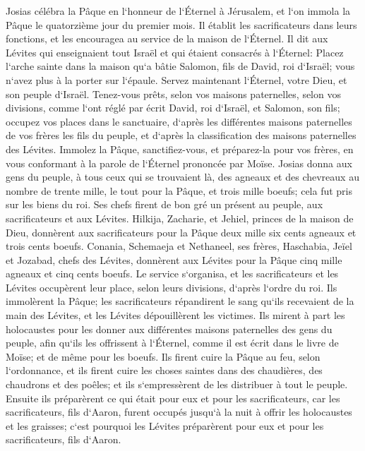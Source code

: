 \verse Josias célébra la Pâque en l`honneur de l`Éternel à Jérusalem, et l`on immola la Pâque le quatorzième jour du premier mois. 
\verse Il établit les sacrificateurs dans leurs fonctions, et les encouragea au service de la maison de l`Éternel. 
\verse Il dit aux Lévites qui enseignaient tout Israël et qui étaient consacrés à l`Éternel: Placez l`arche sainte dans la maison qu`a bâtie Salomon, fils de David, roi d`Israël; vous n`avez plus à la porter sur l`épaule. Servez maintenant l`Éternel, votre Dieu, et son peuple d`Israël. 
\verse Tenez-vous prêts, selon vos maisons paternelles, selon vos divisions, comme l`ont réglé par écrit David, roi d`Israël, et Salomon, son fils; 
\verse occupez vos places dans le sanctuaire, d`après les différentes maisons paternelles de vos frères les fils du peuple, et d`après la classification des maisons paternelles des Lévites. 
\verse Immolez la Pâque, sanctifiez-vous, et préparez-la pour vos frères, en vous conformant à la parole de l`Éternel prononcée par Moïse. 
\verse Josias donna aux gens du peuple, à tous ceux qui se trouvaient là, des agneaux et des chevreaux au nombre de trente mille, le tout pour la Pâque, et trois mille boeufs; cela fut pris sur les biens du roi. 
\verse Ses chefs firent de bon gré un présent au peuple, aux sacrificateurs et aux Lévites. Hilkija, Zacharie, et Jehiel, princes de la maison de Dieu, donnèrent aux sacrificateurs pour la Pâque deux mille six cents agneaux et trois cents boeufs. 
\verse Conania, Schemaeja et Nethaneel, ses frères, Haschabia, Jeïel et Jozabad, chefs des Lévites, donnèrent aux Lévites pour la Pâque cinq mille agneaux et cinq cents boeufs. 
\verse Le service s`organisa, et les sacrificateurs et les Lévites occupèrent leur place, selon leurs divisions, d`après l`ordre du roi. 
\verse Ils immolèrent la Pâque; les sacrificateurs répandirent le sang qu`ils recevaient de la main des Lévites, et les Lévites dépouillèrent les victimes. 
\verse Ils mirent à part les holocaustes pour les donner aux différentes maisons paternelles des gens du peuple, afin qu`ils les offrissent à l`Éternel, comme il est écrit dans le livre de Moïse; et de même pour les boeufs. 
\verse Ils firent cuire la Pâque au feu, selon l`ordonnance, et ils firent cuire les choses saintes dans des chaudières, des chaudrons et des poêles; et ils s`empressèrent de les distribuer à tout le peuple. 
\verse Ensuite ils préparèrent ce qui était pour eux et pour les sacrificateurs, car les sacrificateurs, fils d`Aaron, furent occupés jusqu`à la nuit à offrir les holocaustes et les graisses; c`est pourquoi les Lévites préparèrent pour eux et pour les sacrificateurs, fils d`Aaron. 
